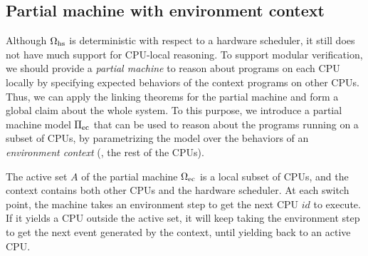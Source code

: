 \subsection{Partial machine with environment context}

Although $\Omega_{\text{hs}}$ is deterministic
with respect to a hardware scheduler,
it still does not have much support for CPU-local reasoning.
To support modular verification, 
we should provide a \emph{partial machine}
 to reason about programs on each CPU locally by specifying
expected behaviors of the context programs on other CPUs. Thus,
we can apply the linking theorems for the partial machine
 and 
 form a global
claim about the whole system. 
To this purpose, we introduce a partial
machine model $\Pi_{\text{ec}}$ that can be used to reason about the
programs running on a subset of CPUs, by
parametrizing the model over the behaviors of an \emph{environment context}
(\ie, the rest of the CPUs).

The active set $A$ of the partial machine  $\Omega_{\text{ec}}$
is a local subset of CPUs,
and the context contains
both other CPUs and the hardware scheduler.
At each switch point,
the machine takes an environment step
to get the next CPU $id$ to execute.
If it yields a CPU outside the active set,
it will keep taking the environment step
to get the next event generated
by the context, until yielding back to an active CPU.

